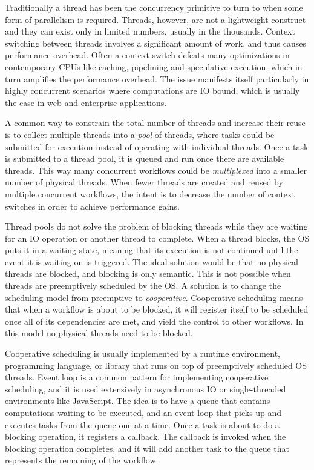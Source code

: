 Traditionally a thread has been the concurrency primitive to turn to when some form of parallelism is required. Threads, however, are not a lightweight construct and they can exist only in limited numbers, usually in the thousands. Context switching between threads involves a significant amount of work, and thus causes performance overhead. Often a context switch defeats many optimizations in contemporary CPUs like caching, pipelining and speculative execution, which in turn amplifies the performance overhead. The issue manifests itself particularly in highly concurrent scenarios where computations are IO bound, which is usually the case in web and enterprise applications.

A common way to constrain the total number of threads and increase their reuse is to collect multiple threads into a \emph{pool} of threads, where tasks could be submitted for execution instead of operating with individual threads. Once a task is submitted to a thread pool, it is queued and run once there are available threads. This way many concurrent workflows could be \emph{multiplexed} into a smaller number of physical threads. When fewer threads are created and reused by multiple concurrent workflows, the intent is to decrease the number of context switches in order to achieve performance gains.

Thread pools do not solve the problem of blocking threads while they are waiting for an IO operation or another thread to complete. When a thread blocks, the OS puts it in a waiting state, meaning that its execution is not continued until the event it is waiting on is triggered. The ideal solution would be that no physical threads are blocked, and blocking is only semantic. This is not possible when threads are preemptively scheduled by the OS. A solution is to change the scheduling model from preemptive to \emph{cooperative}. Cooperative scheduling means that when a workflow is about to be blocked, it will register itself to be scheduled once all of its dependencies are met, and yield the control to other workflows. In this model no physical threads need to be blocked.

Cooperative scheduling is usually implemented by a runtime environment, programming language, or library that runs on top of preemptively scheduled OS threads. Event loop is a common pattern for implementing cooperative scheduling, and it is used extensively in asynchronous IO or single-threaded environments like JavaScript. The idea is to have a queue that contains computations waiting to be executed, and an event loop that picks up and executes tasks from the queue one at a time. Once a task is about to do a blocking operation, it registers a callback. The callback is invoked when the blocking operation completes, and it will add another task to the queue that represents the remaining of the workflow.

